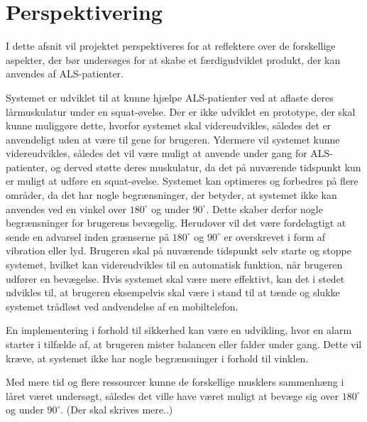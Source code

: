 \section{Perspektivering}
I dette afsnit vil projektet perspektiveres for at reflektere over de forskellige aspekter, der bør undersøges for at skabe et færdigudviklet produkt, der kan anvendes af ALS-patienter. 

Systemet er udviklet til at kunne hjælpe ALS-patienter ved at aflaste deres lårmuskulatur under en squat-øvelse. Der er ikke udviklet en prototype, der skal kunne muliggøre dette, hvorfor systemet skal videreudvikles, således det er anvendeligt uden at være til gene for brugeren. Ydermere vil systemet kunne videreudvikles, således det vil være muligt at anvende under gang for ALS-patienter, og derved støtte deres muskulatur, da det på nuværende tidspunkt kun er muligt at udføre en squat-øvelse. Systemet kan optimeres og forbedres på flere områder, da det har nogle begrænsninger, der betyder, at systemet ikke kan anvendes ved en vinkel over $180^{\circ}$ og under $90^{\circ}$. Dette skaber derfor nogle begrænsninger for brugerens bevægelig. Herudover vil det være fordelagtigt at sende en advarsel inden grænserne på $180^{\circ}$ og  $90^{\circ}$ er overskrevet i form af vibration eller lyd. Brugeren skal på nuværende tidspunkt selv starte og stoppe systemet, hvilket kan videreudvikles til en automatisk funktion, når brugeren udfører en bevægelse. Hvis systemet skal være mere effektivt, kan det i stedet udvikles til, at brugeren eksempelvis skal være i stand til at tænde og slukke systemet trådløst ved andvendelse af en mobiltelefon. 

En implementering i forhold til sikkerhed kan være en udvikling, hvor en alarm starter i tilfælde af, at brugeren mister balancen eller falder under gang. Dette vil kræve, at systemet ikke har nogle begrænsninger i forhold til vinklen. 

Med mere tid og flere ressourcer kunne de forskellige musklers sammenhæng i låret været undersøgt, således det ville have været muligt at bevæge sig over $180^{\circ}$ og under $90^{\circ}$. (Der skal skrives mere..) 




